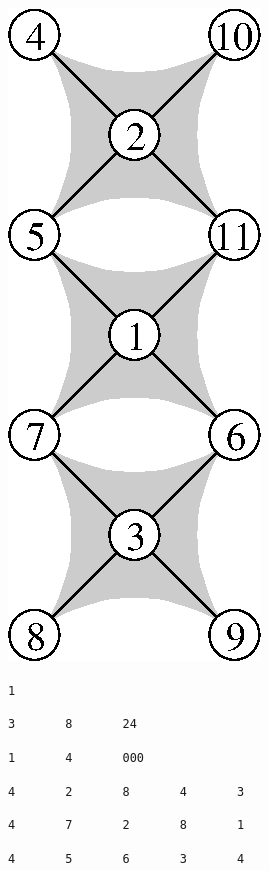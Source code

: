 \begin{figure}[hbt]
\begin{center}
\includegraphics[scale=0.65]{s_f_msf.eps}
\hfil ~\hfil
\begin{minipage}[b]{7cm}
\verb+1+

\noi
\verb+3       8       24+

\noi
\verb+1       4       000+

\verb+4       2 +\verb+      8 +\verb+      4 +\verb+      3 +

\noi
\verb+4       7 +\verb+      2 +\verb+      8 +\verb+      1 +

\noi
\verb+4       5 +\verb+      6 +\verb+      3 +\verb+      4 +


\end{minipage}
\end{center}
\end{figure}
